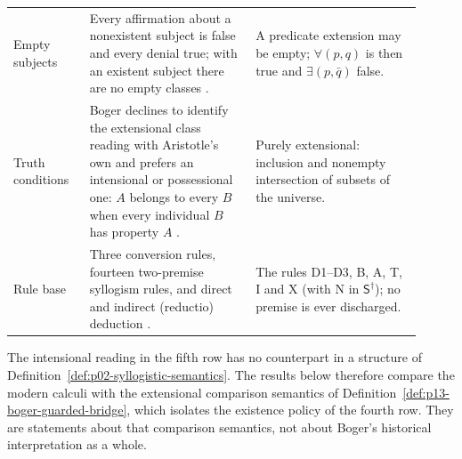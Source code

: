 \begin{longtable}{@{}p{0.17\linewidth}p{0.37\linewidth}p{0.37\linewidth}@{}}
Empty subjects &
Every affirmation about a nonexistent subject is false and every denial
true; with an existent subject there are no empty classes
\cite[pp.~159--163]{Boger2004UnderlyingLogic}. &
A predicate extension may be empty; \(\forall(p,q)\) is then true and
\(\exists(p,\bar q)\) false. \\
Truth conditions &
Boger declines to identify the extensional class reading with Aristotle's
own and prefers an intensional or possessional one: \(A\) belongs to every
\(B\) when every individual \(B\) has property \(A\)
\cite[pp.~164--165]{Boger2004UnderlyingLogic}. &
Purely extensional: inclusion and nonempty intersection of subsets of the
universe. \\
Rule base &
Three conversion rules, fourteen two-premise syllogism rules, and direct and
indirect (reductio) deduction \cite[p.~166]{Boger2004UnderlyingLogic}. &
The rules D1--D3, B, A, T, I and X (with N in \(\mathsf S^\dagger\)); no
premise is ever discharged. \\
\hline
\end{longtable}

The intensional reading in the fifth row has no counterpart in a structure
of Definition~\ref{def:p02-syllogistic-semantics}. The results below
therefore compare the modern calculi with the extensional comparison
semantics of Definition~\ref{def:p13-boger-guarded-bridge}, which isolates
the existence policy of the fourth row. They are statements about that
comparison semantics, not about Boger's historical interpretation as a
whole.

